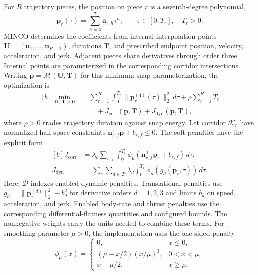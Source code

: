 \documentclass[letterpaper,10pt,journal]{IEEEtran}
\begin{document}
For $R$ trajectory pieces, the position on piece $r$ is a seventh-degree polynomial,
\begin{equation}
\mathbf p_r(\tau)=\sum_{h=0}^{7}\mathbf a_{r,h}\tau^h,
\qquad \tau\in[0,T_r],\quad T_r>0.
\label{eq:trajectory-piece}
\end{equation}
MINCO determines the coefficients from internal interpolation points $\mathbf U=(\mathbf u_1,\ldots,\mathbf u_{R-1})$, durations $\mathbf T$, and prescribed endpoint position, velocity, acceleration, and jerk. Adjacent pieces share derivatives through order three. Internal points are parameterized in the corresponding corridor intersections. Writing $\mathbf p=\mathcal M(\mathbf U,\mathbf T)$ for this minimum-snap parameterization, the optimization is
\begin{equation}
\begin{aligned}[b]
\min_{\mathbf U,\,\mathbf T>\mathbf 0}\quad
&\sum_{r=1}^{R}\int_0^{T_r}\|\mathbf p_r^{(4)}(\tau)\|_2^2\,d\tau
+\rho\sum_{r=1}^{R}T_r\\
&\quad{}+J_{\mathrm{corr}}(\mathbf p,\mathbf T)
+J_{\mathrm{dyn}}(\mathbf p,\mathbf T),
\end{aligned}
\label{eq:minco-safe-corridor}
\end{equation}
where $\rho>0$ trades trajectory duration against snap energy. Let corridor $\mathcal K_r$ have normalized half-space constraints $\mathbf n_{r,f}^{\mathsf T}\mathbf p+b_{r,f}\leq0$. The soft penalties have the explicit form
\begin{equation}
\begin{aligned}[b]
J_{\mathrm{corr}}&=\lambda_c\sum_{r,f}\int_0^{T_r}
\phi_\mu(\mathbf n_{r,f}^{\mathsf T}\mathbf p_r+b_{r,f})\,d\tau,\\
J_{\mathrm{dyn}}&=\sum_{r}\sum_{d\in\mathcal D}\lambda_d
\int_0^{T_r}\phi_\mu(g_d(\mathbf p_r,\tau))\,d\tau.
\end{aligned}
\label{eq:minco-penalties}
\end{equation}
Here, $\mathcal D$ indexes enabled dynamic penalties. Translational penalties use $g_d=\|\mathbf p_r^{(d)}\|_2^2-b_d^2$ for derivative orders $d=1,2,3$ and limits $b_d$ on speed, acceleration, and jerk. Enabled body-rate and thrust penalties use the corresponding differential-flatness quantities and configured bounds. The nonnegative weights carry the units needed to combine these terms. For smoothing parameter $\mu>0$, the implementation uses the one-sided penalty
\begin{equation}
\phi_\mu(x)=
\begin{cases}
0,&x\leq0,\\
(\mu-x/2)(x/\mu)^3,&0<x<\mu,\\
x-\mu/2,&x\geq\mu,
\end{cases}
\label{eq:smooth-penalty}
\end{equation}
\end{document}
